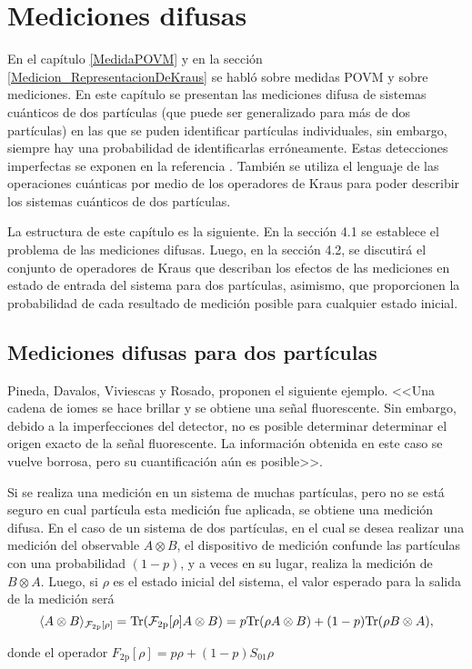 \chapter{Mediciones difusas}


En el capítulo {\ref{MedidaPOVM}} y en la sección {\ref{Medicion_RepresentacionDeKraus}} se habló sobre medidas POVM y sobre mediciones. En este capítulo se presentan las mediciones difusa de sistemas cuánticos de dos partículas (que puede ser generalizado para más de dos partículas) en las que se puden identificar partículas individuales, sin embargo, siempre hay una probabilidad de identificarlas erróneamente. Estas detecciones imperfectas se exponen en la referencia {\cite{Pineda_2021}}. También se utiliza el lenguaje de las operaciones cuánticas por medio de los operadores de Kraus para poder describir los sistemas cuánticos de dos partículas.

La estructura de este capítulo es la siguiente. En la sección 4.1 se establece el problema de las mediciones difusas. Luego, en la sección 4.2, se discutirá el conjunto de operadores de Kraus que describan los efectos de las mediciones  
en estado de entrada del sistema para dos partículas, asimismo, que proporcionen la probabilidad de cada resultado de medición posible para cualquier estado inicial.


\section{Mediciones difusas para dos partículas}

Pineda, Davalos, Viviescas y Rosado, proponen el siguiente ejemplo. <<Una cadena de iomes se hace brillar  y se obtiene una señal fluorescente. Sin embargo, debido a la imperfecciones del detector, no es posible determinar
determinar el origen exacto de la señal fluorescente. La información obtenida en este caso se vuelve borrosa, pero su cuantificación aún es posible>>.

Si se  realiza una  medición en un sistema de muchas partículas, pero no se está seguro en cual partícula esta medición fue aplicada, se obtiene una medición difusa. En el caso de un sistema de dos partículas, en el cual se desea realizar una medición del observable $A\otimes B$, el dispositivo de medición confunde las partículas con una probabilidad $(1-p)$, y a veces en su lugar, realiza la medición de $B\otimes A$. Luego, si $\rho$ es el estado inicial del sistema, el valor esperado para la salida de la medición será {\cite{Pineda_2021}}  \[\langle A\otimes B\rangle_{\mathcal{F_{\text{2p}}[\rho]}}={\rm Tr}(\mathcal{F_{\text{2p}}[\rho]}A\otimes B)=p{\rm Tr}(\rho A\otimes B)+(1-p){\rm Tr}(\rho B\otimes A),\]


donde el operador $F_{\text{2p}}[\rho]=p\rho+(1-p)S_{01}\rho$ 

